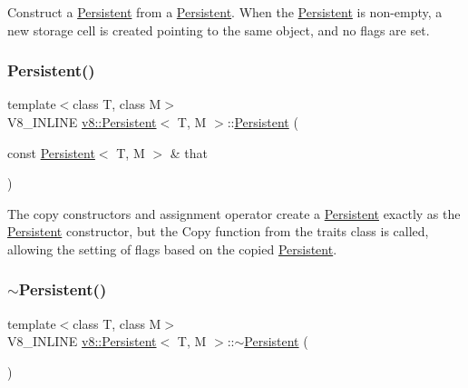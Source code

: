 Construct a \mbox{\hyperlink{classv8_1_1Persistent}{Persistent}} from a \mbox{\hyperlink{classv8_1_1Persistent}{Persistent}}. When the \mbox{\hyperlink{classv8_1_1Persistent}{Persistent}} is non-\/empty, a new storage cell is created pointing to the same object, and no flags are set. \mbox{\label{classv8_1_1Persistent_a22331e91572784cd5ed5519739bb50c7}} 
\subsubsection{\texorpdfstring{Persistent()}{Persistent()}\hspace{0.1cm}{\footnotesize\ttfamily [4/4]}}
{\footnotesize\ttfamily template$<$class T, class M$>$ \\
V8\+\_\+\+I\+N\+L\+I\+NE \mbox{\hyperlink{classv8_1_1Persistent}{v8\+::\+Persistent}}$<$ T, M $>$\+::\mbox{\hyperlink{classv8_1_1Persistent}{Persistent}} (\begin{DoxyParamCaption}\item[{const \mbox{\hyperlink{classv8_1_1Persistent}{Persistent}}$<$ T, M $>$ \&}]{that }\end{DoxyParamCaption})\hspace{0.3cm}{\ttfamily [inline]}}

The copy constructors and assignment operator create a \mbox{\hyperlink{classv8_1_1Persistent}{Persistent}} exactly as the \mbox{\hyperlink{classv8_1_1Persistent}{Persistent}} constructor, but the Copy function from the traits class is called, allowing the setting of flags based on the copied \mbox{\hyperlink{classv8_1_1Persistent}{Persistent}}. \mbox{\label{classv8_1_1Persistent_a7d4d2bebfe3919e447e22adc15464e25}} 
\subsubsection{\texorpdfstring{$\sim$\+Persistent()}{~Persistent()}}
{\footnotesize\ttfamily template$<$class T, class M$>$ \\
V8\+\_\+\+I\+N\+L\+I\+NE \mbox{\hyperlink{classv8_1_1Persistent}{v8\+::\+Persistent}}$<$ T, M $>$\+::$\sim$\mbox{\hyperlink{classv8_1_1Persistent}{Persistent}} (\begin{DoxyParamCaption}{ }\end{DoxyParamCaption})\hspace{0.3cm}{\ttfamily [inline]}}


